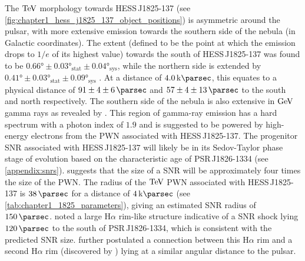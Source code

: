 \newpar
The $\TeV$ morphology towards \mbox{HESS\,J1825-137} (see \autoref{fig:chapter1_hess_j1825_137_object_positions}) is asymmetric around the pulsar, with more extensive emission towards the southern side of the nebula (in Galactic coordinates). The extent (defined to be the point at which the emission drops to $1/e$ of its highest value) towards the south of \mbox{HESS\,J1825-137} was found to be $\ang{0.66}\pm\ang{0.03}_\text{stat}\pm\ang{0.04}_\text{sys}$, while the northern side is extended by $\ang{0.41}\pm\ang{0.03}_\text{stat}\pm\ang{0.09}_\text{sys}$ \citep{2019A&A...621A.116H} . At a distance of $4.0\,\kpc$, this equates to a physical distance of $91\pm4\pm6\,\pc$ and $57\pm4\pm13\,\pc$ to the south and north respectively. The southern side of the nebula is also extensive in $\si{\giga\electronvolt}$ gamma rays as revealed by \cite{2019MNRAS.485.1001A}. This region of gamma-ray emission has a hard spectrum with a photon index of $1.9$ and is suggested to be powered by high-energy electrons from the PWN associated with \mbox{HESS\,J1825-137}.
\newpar
The progenitor SNR associated with \mbox{HESS\,J1825-137} will likely be in its Sedov-Taylor phase stage of evolution based on the characteristic age of \mbox{PSR\,J1826-1334} (see \autoref{appendix:snrs}). \cite{2001A&A...380..309V} suggests that the size of a SNR will be approximately four times the size of the PWN. The radius of the $\TeV$ PWN associated with \mbox{HESS\,J1825-137} is $38\,\pc$ for a distance of $4\,\kpc$ (see \autoref{tab:chapter1_1825_parameters}), giving an estimated SNR radius of $150\,\pc$. \cite{2016MNRAS.458.2813V} noted a large H$\alpha$ rim-like structure indicative of a SNR shock lying $120\,\pc$ to the south of \mbox{PSR\,J1826-1334}, which is consistent with the predicted SNR size. \cite{2016MNRAS.458.2813V} further postulated a connection between this H$\alpha$ rim and a second H$\alpha$ rim (discovered by \cite{2008MNRAS.390.1037S}) lying at a similar angular distance to the pulsar.

